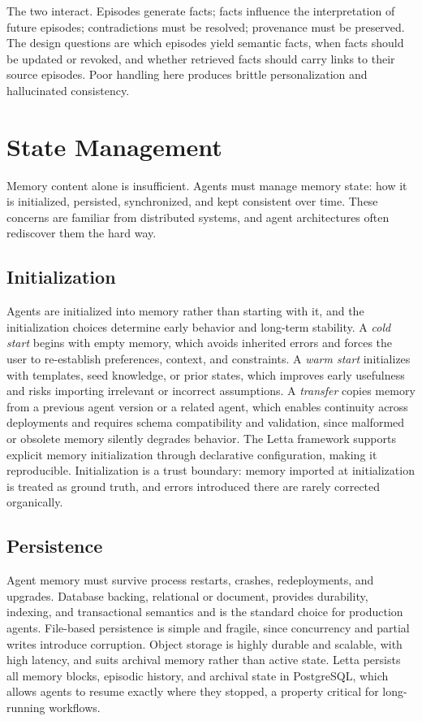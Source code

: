 \documentclass[11pt]{book}
\begin{document}
The two interact. Episodes generate facts; facts influence the interpretation of future episodes; contradictions must be resolved; provenance must be preserved. The design questions are which episodes yield semantic facts, when facts should be updated or revoked, and whether retrieved facts should carry links to their source episodes. Poor handling here produces brittle personalization and hallucinated consistency.

\section{State Management}

Memory content alone is insufficient. Agents must manage memory state: how it is initialized, persisted, synchronized, and kept consistent over time. These concerns are familiar from distributed systems, and agent architectures often rediscover them the hard way.

\subsection{Initialization}

Agents are initialized into memory rather than starting with it, and the initialization choices determine early behavior and long-term stability. A \textit{cold start} begins with empty memory, which avoids inherited errors and forces the user to re-establish preferences, context, and constraints. A \textit{warm start} initializes with templates, seed knowledge, or prior states, which improves early usefulness and risks importing irrelevant or incorrect assumptions. A \textit{transfer} copies memory from a previous agent version or a related agent, which enables continuity across deployments and requires schema compatibility and validation, since malformed or obsolete memory silently degrades behavior. The Letta framework supports explicit memory initialization through declarative configuration, making it reproducible. Initialization is a trust boundary: memory imported at initialization is treated as ground truth, and errors introduced there are rarely corrected organically.

\subsection{Persistence}

Agent memory must survive process restarts, crashes, redeployments, and upgrades. Database backing, relational or document, provides durability, indexing, and transactional semantics and is the standard choice for production agents. File-based persistence is simple and fragile, since concurrency and partial writes introduce corruption. Object storage is highly durable and scalable, with high latency, and suits archival memory rather than active state. Letta persists all memory blocks, episodic history, and archival state in PostgreSQL, which allows agents to resume exactly where they stopped, a property critical for long-running workflows.
\end{document}
